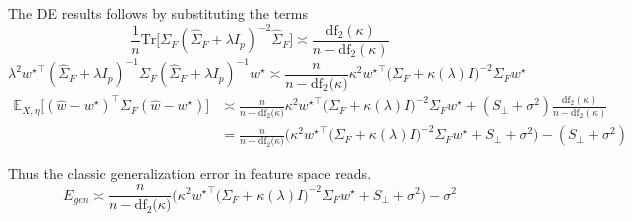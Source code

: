 The DE results follows by substituting the terms
\[
\frac{1}{n}\mathrm{Tr}\big[\Sigma_{F}(\hat{\Sigma}_{F}+\lambda I_{p})^{-2}\hat{\Sigma}_{F}\big]\asymp\frac{\mathrm{df}_{2}(\kappa)}{n-\mathrm{df}_{2}(\kappa)}
\]
\[
\lambda^{2}{w^\star}^{\top}(\hat{\Sigma}_{F}+\lambda I_{p})^{-1}\Sigma_{F}(\hat{\Sigma}_{F}+\lambda I_{p})^{-1}w^{\star}\asymp\frac{n}{n-\mathrm{df}_{2}\bigl(\kappa\bigr)}\kappa^{2}{w^\star}^{\top}\bigl(\Sigma_{F}+\kappa(\lambda)I\bigr)^{-2}\Sigma_{F}w^{\star}
\]
\begin{align*}
\mathbb{E}_{X,\eta}\big[(\hat{w}-w^{\star})^{\top}\Sigma_{F}(\hat{w}-w^{\star})\big] & \asymp\frac{n}{n-\mathrm{df}_{2}\bigl(\kappa\bigr)}\kappa^{2}{w^\star}^{\top}\bigl(\Sigma_{F}+\kappa(\lambda)I\bigr)^{-2}\Sigma_{F}w^{\star}+(S_{\perp}+\sigma^{2})\frac{\mathrm{df}_{2}(\kappa)}{n-\mathrm{df}_{2}(\kappa)}\\
 & =\frac{n}{n-\mathrm{df}_{2}\bigl(\kappa\bigr)}\Big(\kappa^{2}{w^\star}^{\top}\bigl(\Sigma_{F}+\kappa(\lambda)I\bigr)^{-2}\Sigma_{F}w^{\star}+S_{\perp}+\sigma^{2}\Big)-(S_{\perp}+\sigma^{2})
\end{align*}

Thus the classic generalization error in feature space reads.
\begin{equation}
E_{gen}\asymp\frac{n}{n-\mathrm{df}_{2}\bigl(\kappa\bigr)}\Big(\kappa^{2}{w^\star}^{\top}\bigl(\Sigma_{F}+\kappa(\lambda)I\bigr)^{-2}\Sigma_{F}w^{\star}+S_{\perp}+\sigma^{2}\Big)-\sigma^{2}\label{eq:feat_space_E_gen_DE_eq}
\end{equation}

